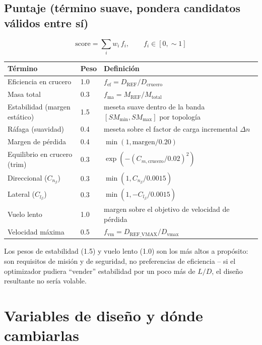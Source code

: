 \documentclass[11pt,a4paper]{article}
\begin{document}
\subsection{Puntaje (término suave, pondera candidatos válidos entre sí)}

\begin{equation}
\text{score} = \sum_i w_i \, f_i, \qquad f_i \in [0, \sim 1]
\end{equation}

\begin{longtable}{@{}p{4.6cm}p{2cm}p{8.7cm}@{}}
\toprule
\textbf{Término} & \textbf{Peso} & \textbf{Definición} \\
\midrule
\endhead
Eficiencia en crucero & 1.0 & $f_\text{ef} = D_\text{REF}/D_\text{crucero}$ \\
Masa total & 0.3 & $f_\text{ma} = M_\text{REF}/M_\text{total}$ \\
Estabilidad (margen estático) & 1.5 & meseta suave dentro de la banda $[SM_\text{min}, SM_\text{max}]$ por topología \\
Ráfaga (suavidad) & 0.4 & meseta sobre el factor de carga incremental $\Delta n$ \\
Margen de pérdida & 0.4 & $\min(1, \text{margen}/0.20)$ \\
Equilibrio en crucero (trim) & 0.3 & $\exp(-(C_{m,\text{crucero}}/0.02)^2)$ \\
Direccional ($C_{n_\beta}$) & 0.3 & $\min(1, C_{n_\beta}/0.0015)$ \\
Lateral ($C_{l_\beta}$) & 0.3 & $\min(1, -C_{l_\beta}/0.0015)$ \\
Vuelo lento & 1.0 & margen sobre el objetivo de velocidad de pérdida \\
Velocidad máxima & 0.5 & $f_\text{vm} = D_\text{REF\_VMAX}/D_\text{vmax}$ \\
\bottomrule
\end{longtable}

Los pesos de estabilidad (1.5) y vuelo lento (1.0) son los más altos a propósito: son requisitos de misión y de seguridad, no preferencias de eficiencia -- si el optimizador pudiera ``vender'' estabilidad por un poco más de $L/D$, el diseño resultante no sería volable.

\section{Variables de diseño y dónde cambiarlas}
\label{sec:donde-cambiar}
\end{document}
